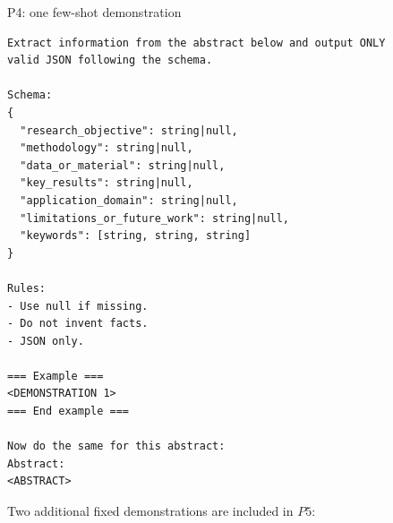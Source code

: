 \documentclass[fleqn,10pt]{wlscirep-authoryear}
\begin{document}
\begin{promptbox}{P4: one few-shot demonstration}
\begin{lstlisting}[style=promptstyle]
Extract information from the abstract below and output ONLY
valid JSON following the schema.

Schema:
{
  "research_objective": string|null,
  "methodology": string|null,
  "data_or_material": string|null,
  "key_results": string|null,
  "application_domain": string|null,
  "limitations_or_future_work": string|null,
  "keywords": [string, string, string]
}

Rules:
- Use null if missing.
- Do not invent facts.
- JSON only.

=== Example ===
<DEMONSTRATION 1>
=== End example ===

Now do the same for this abstract:
Abstract:
<ABSTRACT>
\end{lstlisting}
\end{promptbox}

Two additional fixed demonstrations are included in $P5$:
\end{document}
